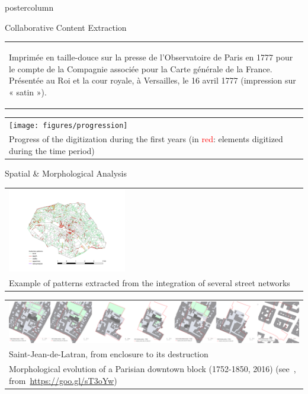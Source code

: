 \documentclass[final,hyperref={pdfpagelabels=false}]{beamer}
\let\oldcite=\cite
\renewcommand{\cite}[1]{\textcolor{ta3chameleon}{\oldcite{#1}}}
\begin{document}
\begin{frame}
\begin{columns}
\begin{column}{0.5\textwidth}
\begin{beamercolorbox}[center,wd=\textwidth]{postercolumn}
\begin{minipage}[t]{.98\textwidth}
\begin{block}{Collaborative Content Extraction}
\begin{tabular}{p{}}
\begin{flushleft}
{            Imprimée en taille-douce sur la presse de l'Observatoire de Paris en 1777 pour le compte de la Compagnie associée pour la Carte générale de la France.
            Présentée au Roi et la cour royale, à Versailles, le 16 avril 1777 (impression sur « satin »).
          }
          \end{flushleft}
        \end{tabular}
        \begin{tabular}{>{\centering}p{}}
          \texttt{[image: figures/progression]}\\
          \scriptsize Progress of the digitization during the first years (in \textcolor{red}{red}: elements digitized during the time period)
        \end{tabular}
      \end{block}
      \begin{block}{Spatial \& Morphological Analysis}
        \centering
	\begin{tabular}{>{\centering}m{}}
	  \includegraphics[width=0.4\textwidth,trim={4.5cm 1.7cm 4.5cm 3.2cm},clip]{figures/EvolutionPatterns}\\
	  \scriptsize Example of patterns extracted from the integration of several street networks~\cite{Costes2015_,Costes2016PhD}
        \end{tabular}
        
        \begin{tabular}{>{\centering}m{\textwidth}}
	  \includegraphics[width=\textwidth]{figures/Latran_1752-2016_small}\\
	  \scriptsize Saint-Jean-de-Latran, from enclosure to its destruction\\
	  \scriptsize Morphological evolution of a Parisian downtown block (1752-1850, 2016)
	  (see~\cite{Rebolledo-Dhuin2014}, from~\url{https://goo.gl/sT3oYw})
        \end{tabular}
        

\end{block}
\end{minipage}
\end{beamercolorbox}
\end{column}
\end{columns}
\end{frame}
\end{document}
